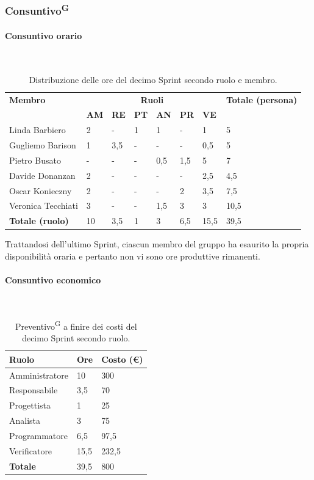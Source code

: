 \documentclass[8pt]{article}
\newcommand{\glossterm}[1]{#1\textsuperscript{G}} %
\newcommand{\subsubsubsection}[1]{\paragraph{#1}\mbox{}\\}
\begin{document}
\subsubsection{\glossterm{Consuntivo}}
\subsubsubsection{Consuntivo orario}
\begin{table}[H]
	\centering
	\begin{tabular}{p{4cm} *{6}{l} p{3cm}}
		\toprule
		\textbf{Membro} & \multicolumn{6}{c}{\textbf{Ruoli}} & \textbf{Totale
        (persona)}\\
		& \textbf{AM} & \textbf{RE} & \textbf{PT} & \textbf{AN} & \textbf{PR} & \textbf{VE}\\
		\midrule
        Linda Barbiero     & 2 & -   & 1 & 1   & -   & 1   & 5 \\  
        Gugliemo Barison   & 1 & 3,5 & - & -   & -   & 0,5 & 5 \\ 
        Pietro Busato      & - & -   & - & 0,5 & 1,5 & 5   & 7 \\ 
        Davide Donanzan    & 2 & -   & - & -   & -   & 2,5 & 4,5 \\ 
        Oscar Konieczny    & 2 & -   & - & -   & 2   & 3,5 & 7,5 \\ 
        Veronica Tecchiati & 3 & -   & - & 1,5 & 3   & 3   & 10,5 \\ 
        \midrule
        \textbf{Totale (ruolo)} & 10 & 3,5 & 1 & 3 & 6,5 & 15,5 & 39,5 \\ 
		\bottomrule
	\end{tabular}
	\caption{Distribuzione delle ore del decimo Sprint secondo ruolo e membro.}
	\label{table:Distribuzione delle ore del decimo Sprint secondo ruolo e membro}
\end{table}
Trattandosi dell'ultimo Sprint, ciascun membro del gruppo ha esaurito la propria disponibilità oraria e pertanto non vi sono ore produttive rimanenti.
\subsubsubsection{Consuntivo economico}
\begin{table}[ht!]
    \centering
    \begin{tabular}{p{4cm} p{1.8cm} p{2.2cm}}
        \toprule
        \textbf{Ruolo} & \textbf{Ore} & \textbf{Costo (€)} \\
        \midrule
        Amministratore & 10 & 300 \\ 
        Responsabile & 3,5 & 70 \\ 
        Progettista & 1 & 25 \\ 
        Analista & 3 &75 \\ 
        Programmatore & 6,5 & 97,5 \\ 
        Verificatore & 15,5 & 232,5 \\
        \midrule 
        \textbf{Totale} & 39,5 & 800 \\ 
        \bottomrule
    \end{tabular}
    \caption{\glossterm{Preventivo} a finire dei costi del decimo Sprint secondo ruolo.}
    \label{table:Preventivo a finire dei costi del decimo Sprint secondo ruolo}
\end{table}
\end{document}
